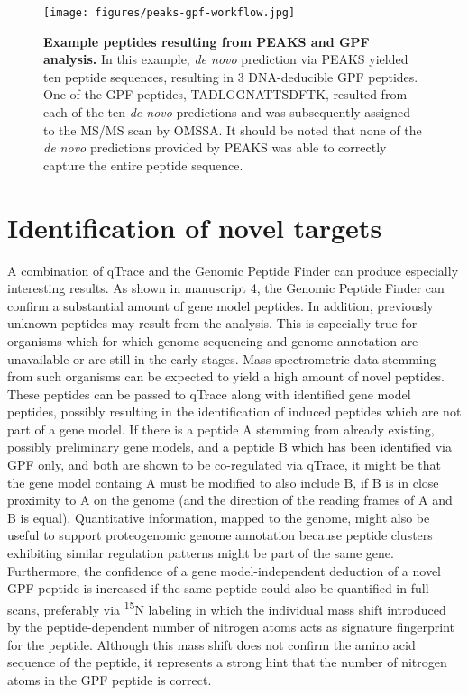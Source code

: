 \begin{figure}
\texttt{[image: figures/peaks-gpf-workflow.jpg]}
\caption{
    {\bf Example peptides resulting from PEAKS and GPF analysis.}
    In this example, {\em de novo} prediction via PEAKS yielded
    ten peptide sequences, resulting in 3 DNA-deducible GPF peptides.
    One of the GPF peptides, TADLGGNATTSDFTK, resulted from each of
    the ten {\em de novo} predictions and was subsequently assigned
    to the MS/MS scan by OMSSA.
    It should be noted that none of the {\em de novo} predictions
    provided by PEAKS was able to correctly capture the entire peptide 
    sequence.
}
\label{fig:peaks-gpf-workflow}
\end{figure}


\section{Identification of novel targets}

A combination of qTrace and the Genomic Peptide Finder can produce especially
interesting results.
As shown in manuscript 4, the Genomic Peptide Finder can confirm a substantial
amount of gene model peptides.
In addition, previously unknown peptides may result from the analysis.
This is especially true for organisms which for which genome sequencing and
genome annotation are unavailable or are still in the early stages.
Mass spectrometric data stemming from such organisms can be expected to
yield a high amount of novel peptides.
These peptides can be passed to qTrace along with identified gene model 
peptides, possibly resulting in the identification of induced peptides which
are not part of a gene model.
If there is a peptide A stemming from already existing, possibly preliminary gene
models, and a peptide B which has been identified via GPF only, and both
are shown to be co-regulated via qTrace, it might be that the gene model
containg A must be modified to also include B, if B is in close proximity to A
on the genome (and the direction of the reading frames of A and B is equal).
Quantitative information, mapped to the genome, might also be useful to
support proteogenomic genome annotation because peptide clusters exhibiting 
similar regulation patterns might be part of the same gene.
Furthermore, the confidence of a gene model-independent deduction of a novel 
GPF peptide is increased if the same peptide could also be quantified in full
scans, preferably via \textsuperscript{15}N labeling in which the individual
mass shift introduced by the peptide-dependent number of nitrogen atoms acts
as signature fingerprint for the peptide.
Although this mass shift does not confirm the amino acid sequence of the 
peptide, it represents a strong hint that the number of nitrogen atoms in
the GPF peptide is correct.

